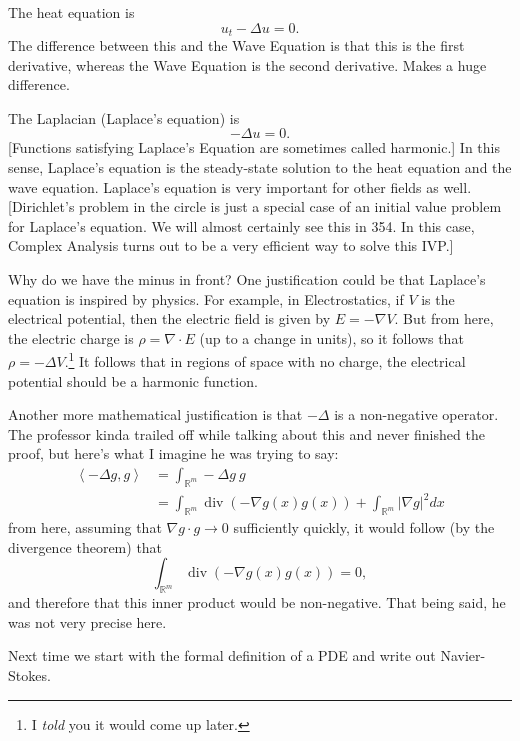 \begin{example}
	The heat equation is
		\[ u_{t} - \Delta u = 0. \]
		The difference between this and the Wave Equation is that this is the first derivative, whereas the Wave Equation is the second derivative. Makes a huge difference.
\end{example}

\begin{example}
	 The Laplacian (Laplace's equation) is 
		\[ - \Delta u = 0. \]
		[Functions satisfying Laplace's Equation are sometimes called harmonic.] In this sense, Laplace's equation is the steady-state solution to the heat equation and the wave equation. Laplace's equation is very important for other fields as well. [Dirichlet's problem in the circle is just a special case of an initial value problem for Laplace's equation. We will almost certainly see this in 354. In this case, Complex Analysis turns out to be a very efficient way to solve this IVP.]
	\begin{remark}
		Why do we have the minus in front? One justification could be that Laplace's equation is inspired by physics. For example, in Electrostatics, if \( V \) is the electrical potential, then the electric field is given by \( E = - \nabla V  \). But from here, the electric charge is \( \rho = \nabla \cdot E \) (up to a change in units), so it follows that \( \rho = - \Delta V \).\footnote{I \textit{told} you it would come up later.} It follows that in regions of space with no charge, the electrical potential should be a harmonic function.

		Another more mathematical justification is that \( -\Delta \) is a non-negative operator. The professor kinda trailed off while talking about this and never finished the proof, but here's what I imagine he was trying to say:
		\begin{align*}
			\left\langle - \Delta g, g \right\rangle &= \int_{\mathbb{R}^{m}} - \Delta g \ g \\
			&= \int_{\mathbb{R}^{m}} \operatorname{div} \left( - \nabla g(x) g(x) \right) + \int_{\mathbb{R}^{m}}  | \nabla g|^{2} dx
		\end{align*}
		from here, assuming that \( \nabla g \cdot g \to 0 \) sufficiently quickly, it would follow (by the divergence theorem) that 
		\[ \int_{\mathbb{R}^{m}} \operatorname{div} \left( - \nabla g(x) g(x) \right) = 0, \]
		and therefore that this inner product would be non-negative. That being said, he was not very precise here.
		
	\end{remark}
\end{example}
	Next time we start with the formal definition of a PDE and write out Navier-Stokes.
